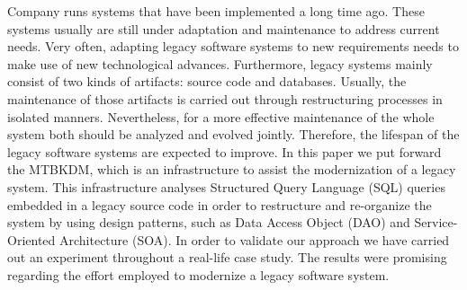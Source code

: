 Company runs systems that have been implemented a long time ago. These systems usually are still under adaptation and maintenance to address current needs. Very often, adapting legacy software systems to new requirements needs to make use of new technological advances. Furthermore, legacy systems mainly consist of two kinds of artifacts: source code and databases. Usually, the maintenance of those artifacts is carried out through restructuring processes in isolated manners. Nevertheless, for a more effective maintenance of the whole system both should be analyzed and evolved jointly. Therefore, the lifespan of the legacy software systems are expected to improve. In this paper we put forward the MTBKDM, which is an infrastructure  to assist the modernization of a legacy system.%
This infrastructure analyses Structured Query Language (SQL) queries embedded in a legacy source code in order to restructure and re-organize the system by using design patterns, such as Data Access Object (DAO) and Service-Oriented Architecture (SOA). In  order to validate our approach we have carried out an experiment throughout a real-life case study. The results were promising regarding the effort employed to modernize a legacy software system.